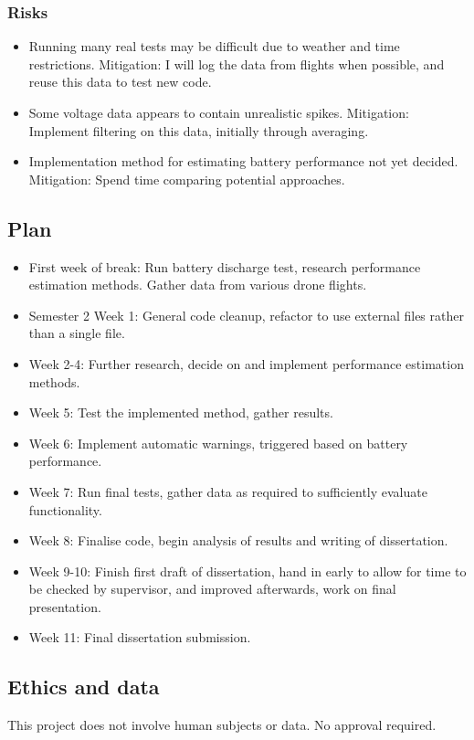 \documentclass[11pt]{article}
\begin{document}
\subsubsection{Risks}\label{risks}

\begin{itemize}
    \item Running many real tests may be difficult due to weather and time restrictions. Mitigation: I will log the data from flights when possible, and reuse this data to test new code.
    \item Some voltage data appears to contain unrealistic spikes. Mitigation: Implement filtering on this data, initially through averaging.
    \item Implementation method for estimating battery performance not yet decided. Mitigation: Spend time comparing potential approaches.
\end{itemize}

\subsection{Plan}\label{plan}

\begin{itemize}
    \item First week of break: Run battery discharge test, research performance estimation methods. Gather data from various drone flights.
    \item Semester 2 Week 1: General code cleanup, refactor to use external files rather than a single file.
    \item Week 2-4: Further research, decide on and implement performance estimation methods.
    \item Week 5: Test the implemented method, gather results.
    \item Week 6: Implement automatic warnings, triggered based on battery performance.
    \item Week 7: Run final tests, gather data as required to sufficiently evaluate functionality.
    \item Week 8: Finalise code, begin analysis of results and writing of dissertation.
    \item Week 9-10: Finish first draft of dissertation, hand in early to allow for time to be checked by supervisor, and improved afterwards, work on final presentation.
    \item Week 11: Final dissertation submission.
\end{itemize}

    
\subsection{Ethics and data}\label{ethics}

This project does not involve human subjects or data. No approval required.
\end{document}

